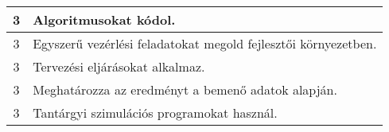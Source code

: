 \begin{longtable}{c | p{} }
                                
                                          3 &  Algoritmusokat kódol. \\ \hline
                                          3 &  Egyszerű vezérlési feladatokat megold fejlesztői környezetben. \\ \hline
                                          3 &  Tervezési eljárásokat alkalmaz. \\ \hline
                                          3 &  Meghatározza az eredményt a bemenő adatok alapján. \\ \hline
                                          3 &  Tantárgyi szimulációs programokat használ. \\ \hline
                                      
                        \end{longtable}
            \clearpage

